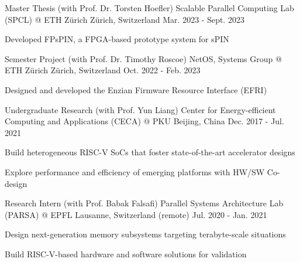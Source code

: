 

\begin{cventries}

  \cventry
    {Master Thesis (with Prof. Dr. Torsten Hoefler)} %
    {Scalable Parallel Computing Lab (SPCL) @ ETH Z\"urich} %
    {Z\"urich, Switzerland} %
    {Mar. 2023 - Sept. 2023} %
    {
      \begin{cvitems} %
        \item {Developed FPsPIN, a FPGA-based prototype system for sPIN}
      \end{cvitems}
    }

  \cventry
    {Semester Project (with Prof. Dr. Timothy Roscoe)} %
    {NetOS, Systems Group @ ETH Z\"urich} %
    {Z\"urich, Switzerland} %
    {Oct. 2022 - Feb. 2023} %
    {
      \begin{cvitems} %
        \item {Designed and developed the Enzian Firmware Resource Interface (EFRI)}
      \end{cvitems}
    }

  \cventry
    {Undergraduate Research (with Prof. Yun Liang)} %
    {Center for Energy-efficient Computing and Applications (CECA) @ PKU} %
    {Beijing, China} %
    {Dec. 2017 - Jul. 2021} %
    {
      \begin{cvitems} %
        \item {Build heterogeneous RISC-V SoCs that foster state-of-the-art accelerator designs}
        \item {Explore performance and efficiency of emerging platforms with HW/SW Co-design}
      \end{cvitems}
    }

  \cventry
    {Research Intern (with Prof. Babak Falsafi)} %
    {Parallel Systems Architecture Lab (PARSA) @ EPFL} %
    {Lausanne, Switzerland (remote)} %
    {Jul. 2020 - Jan. 2021} %
    {
      \begin{cvitems} %
        \item {Design next-generation memory subsystems targeting terabyte-scale situations}
        \item {Build RISC-V-based hardware and software solutions for validation}
      \end{cvitems}
    }


\end{cventries}
